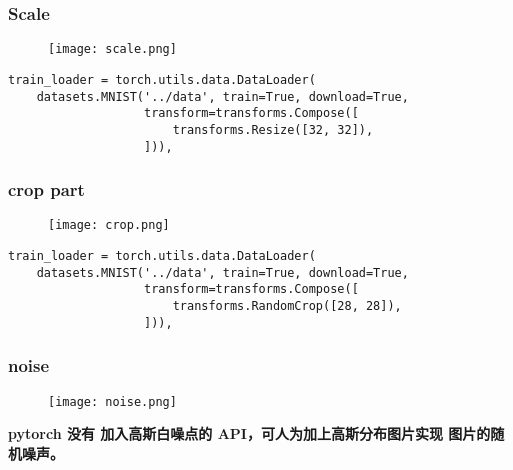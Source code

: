 \subsubsection{Scale}
\begin{figure}[!h]
  \centering
  \texttt{[image: scale.png]}
\end{figure}

\begin{lstlisting}
train_loader = torch.utils.data.DataLoader(
    datasets.MNIST('../data', train=True, download=True,
                   transform=transforms.Compose([
                       transforms.Resize([32, 32]),
                   ])),
\end{lstlisting}


\subsubsection{crop part}
\begin{figure}[!h]
  \centering
  \texttt{[image: crop.png]}
\end{figure}

\begin{lstlisting}
train_loader = torch.utils.data.DataLoader(
    datasets.MNIST('../data', train=True, download=True,
                   transform=transforms.Compose([
                       transforms.RandomCrop([28, 28]),
                   ])),
\end{lstlisting}

\subsubsection{noise}
\begin{figure}[!h]
  \centering
  \texttt{[image: noise.png]}
\end{figure}

\textbf{pytorch 没有 加入高斯白噪点的 API，可人为加上高斯分布图片实现 图片的随机噪声。}






























